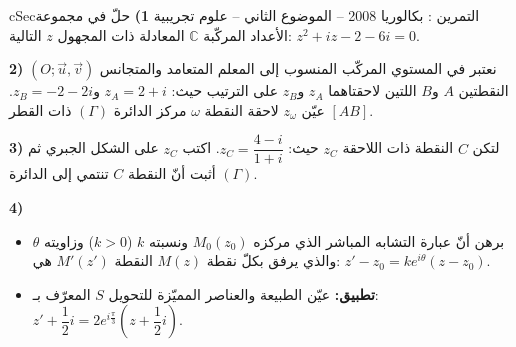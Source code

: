 \documentclass[12pt,a4paper]{article}
\newenvironment{BOX}[2]{\begin{otherlanguage}{english}\begin{arbox}{#1}{#2}}{\end{arbox}\end{otherlanguage}}
\newcounter{exo}
\newenvironment{tamrin}[1]{\stepcounter{exo}\begin{BOX}{cSec}{التمرين \theexo: #1}}{\end{BOX}}
\newenvironment{sq}{\begin{itemize}[leftmargin=2.4em,itemsep=3pt]}{\end{itemize}}
\newcommand{\qa}{\item[(أ)]}\newcommand{\qb}{\item[(ب)]}\newcommand{\qc}{\item[(جـ)]}\newcommand{\qd}{\item[(د)]}\newcommand{\qe}{\item[(هـ)]}
\begin{document}
\begin{tamrin}{بكالوريا 2008 -- الموضوع الثاني -- علوم تجريبية}
\textbf{1)} حلّ في مجموعة الأعداد المركّبة $\mathbb{C}$ المعادلة ذات المجهول $z$ التالية: $z^2+iz-2-6i=0$.

\textbf{2)} نعتبر في المستوي المركّب المنسوب إلى المعلم المتعامد والمتجانس $(O;\vec u,\vec v)$ النقطتين $A$ و$B$ اللتين لاحقتاهما $z_A$ و$z_B$ على الترتيب حيث: $z_A=2+i$ و$z_B=-2-2i$.
عيّن $z_\omega$ لاحقة النقطة $\omega$ مركز الدائرة $(\Gamma)$ ذات القطر $[AB]$.

\textbf{3)} لتكن $C$ النقطة ذات اللاحقة $z_C$ حيث: $z_C=\dfrac{4-i}{1+i}$.
اكتب $z_C$ على الشكل الجبري ثم أثبت أنّ النقطة $C$ تنتمي إلى الدائرة $(\Gamma)$.

\textbf{4)}
\begin{sq}
\qa برهن أنّ عبارة التشابه المباشر الذي مركزه $M_0(z_0)$ ونسبته $k$ ($k>0$) وزاويته $\theta$ والذي يرفق بكلّ نقطة $M(z)$ النقطة $M'(z')$ هي: $z'-z_0=ke^{i\theta}(z-z_0)$.
\qb \textbf{تطبيق:} عيّن الطبيعة والعناصر المميّزة للتحويل $S$ المعرّف بـ: $z'+\dfrac12 i=2e^{i\frac{\pi}{3}}\left(z+\dfrac12 i\right)$.
\end{sq}
\end{tamrin}
\end{document}
